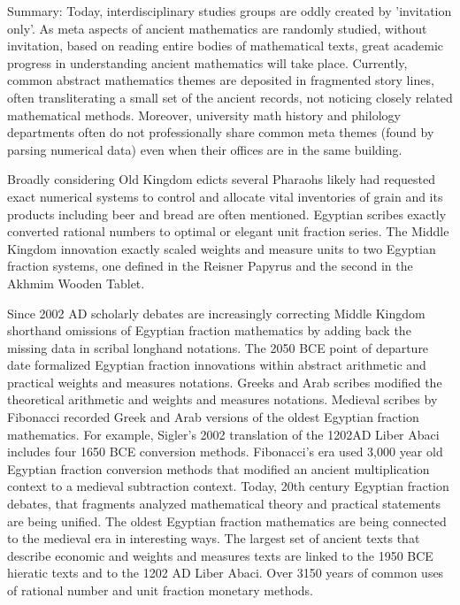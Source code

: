 \documentclass[12pt]{article}
\begin{document}
Summary: Today, interdisciplinary studies groups are oddly created by 'invitation only'. As meta aspects of ancient mathematics are randomly studied, without invitation, based on reading entire bodies of mathematical texts, great academic progress in understanding ancient mathematics will take place. Currently, common abstract mathematics themes are deposited in fragmented story lines, often transliterating a small set of the ancient records, not noticing closely related mathematical methods. Moreover, university math history and philology departments often do not professionally share common meta themes (found by parsing numerical data) even when their offices are in the same building.

Broadly considering Old Kingdom edicts several Pharaohs likely had requested exact numerical systems to control and allocate vital inventories of grain and its products including beer and bread are often mentioned. Egyptian scribes exactly converted rational numbers to optimal or elegant unit fraction series. The Middle Kingdom innovation exactly scaled weights and measure units to two Egyptian fraction systems, one defined in the Reisner Papyrus and the second in the Akhmim Wooden Tablet.

Since 2002 AD scholarly debates are increasingly correcting Middle Kingdom shorthand omissions of Egyptian fraction mathematics by adding back the missing data in scribal longhand notations. The 2050 BCE point of departure date formalized Egyptian fraction innovations within abstract arithmetic and practical weights and measures notations. Greeks and Arab scribes modified the theoretical arithmetic and weights and measures notations. Medieval scribes by Fibonacci recorded Greek and Arab versions of the oldest Egyptian fraction mathematics. For example, Sigler's 2002 translation of the 1202AD Liber Abaci includes four 1650 BCE conversion methods. Fibonacci's era used 3,000 year old Egyptian fraction conversion methods that modified an ancient multiplication context to a medieval subtraction context. Today, 20th century Egyptian fraction debates, that fragments analyzed mathematical theory and practical statements are being unified. The oldest Egyptian fraction mathematics  are being connected to the medieval era in interesting ways. The largest set of ancient texts that describe economic and weights and measures texts are linked to the 1950 BCE hieratic texts and to the 1202 AD Liber Abaci. Over 3150 years of common uses of rational number and unit fraction monetary methods.  
\end{document}
